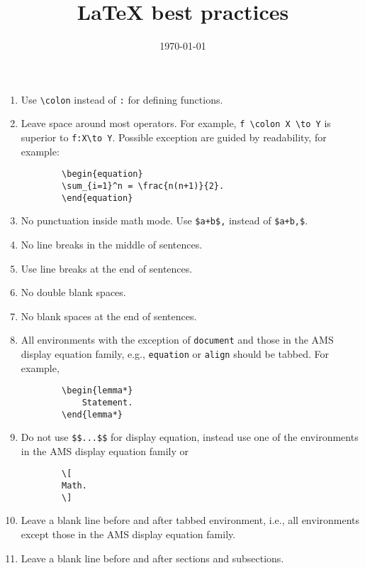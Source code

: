\documentclass{amsart}
\title{{\LaTeX} best practices}
\date{\today}
\begin{document}
	\maketitle

	\begin{enumerate}[1)]
		\item Use \verb|\colon| instead of \verb|:| for defining functions.

		\item Leave space around most operators.
		For example, \verb|f \colon X \to Y| is superior to \verb|f:X\to Y|.
		Possible exception are guided by readability, for example:
		\begin{verbatim}
		\begin{equation}
		\sum_{i=1}^n = \frac{n(n+1)}{2}.
		\end{equation}
		\end{verbatim}

		\item No punctuation inside math mode.
		Use \verb|$a+b$,| instead of \verb|$a+b,$|.

		\item No line breaks in the middle of sentences.

		\item Use line breaks at the end of sentences.

		\item No double blank spaces.

		\item No blank spaces at the end of sentences.

		\item All environments with the exception of \verb|document| and those in the AMS display equation family, e.g., \verb|equation| or \verb|align| should be tabbed.
		For example,
		\begin{verbatim}
		\begin{lemma*}
		    Statement.
		\end{lemma*}
		\end{verbatim}

		\item Do not use \verb|$$...$$| for display equation, instead use one of the environments in the AMS display equation family or
		\begin{verbatim}
		\[
		Math.
		\]
		\end{verbatim}

		\item Leave a blank line before and after tabbed environment, i.e., all environments except those in the AMS display equation family.

		\item Leave a blank line before and after sections and subsections.
	\end{enumerate}
\end{document}
